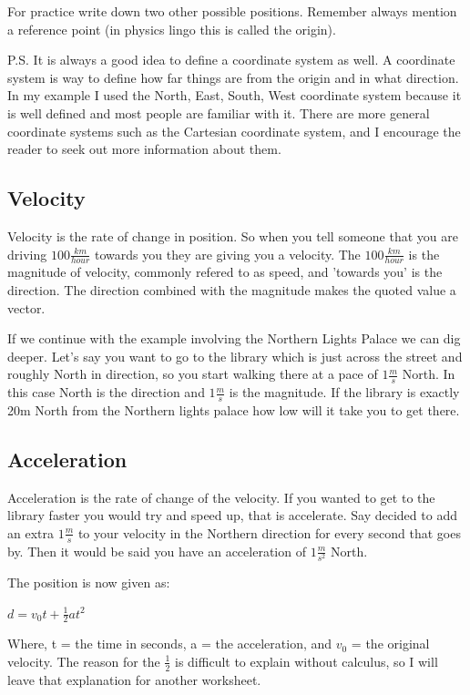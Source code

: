 \documentclass[12pt]{article}
\begin{document}
For practice write down two other possible positions. Remember always mention a reference point (in physics lingo this is called the origin).

\parbox[][12cm][t]{8cm}{}

P.S. It is always a good idea to define a coordinate system as well. A coordinate system is way to define how far things are from the origin and in what direction. In my example I used the North, East, South, West coordinate system because it is well defined and most people are familiar with it. There are more general coordinate systems such as the Cartesian coordinate system, and I encourage the reader to seek out more information about them.

\subsection{Velocity}
Velocity is the rate of change in position. So when you tell someone that you are driving $100 \frac{km}{hour}$ towards you they are giving you a velocity. The $100 \frac{km}{hour}$ is the magnitude of velocity, commonly refered to as speed, and 'towards you' is the direction. The direction combined with the magnitude makes the quoted value a vector.

If we continue with the example involving the Northern Lights Palace we can dig deeper. Let's say you want to go to the library which is just across the street and roughly North in direction, so you start walking there at a pace of $1 \frac{m}{s}$ North. In this case North is the direction and $1 \frac{m}{s}$ is the magnitude. If the library is exactly 20m North from the Northern lights palace how low will it take you to get there.

\parbox[][12cm][t]{8cm}{}

\subsection{Acceleration}
Acceleration is the rate of change of the velocity. If you wanted to get to the library faster you would try and speed up, that is accelerate. Say decided to add an extra $1 \frac{m}{s}$ to your velocity in the Northern direction for every second that goes by. Then it would be said you have an acceleration of $1 \frac{m}{s^2}$ North.

The position is now given as:

$d = v_0t + \frac{1}{2}at^2$

Where, t = the time in seconds, a = the acceleration, and $v_0$ = the original velocity. The reason for the $\frac{1}{2}$ is difficult to explain without calculus, so I will leave that explanation for another worksheet.
\end{document}
